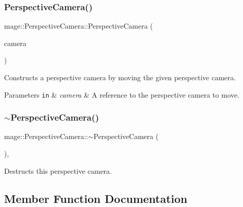 \subsubsection{\texorpdfstring{Perspective\+Camera()}{PerspectiveCamera()}\hspace{0.1cm}{\footnotesize\ttfamily [5/5]}}
{\footnotesize\ttfamily mage\+::\+Perspective\+Camera\+::\+Perspective\+Camera (\begin{DoxyParamCaption}\item[{\hyperlink{classmage_1_1_perspective_camera}{Perspective\+Camera} \&\&}]{camera }\end{DoxyParamCaption})\hspace{0.3cm}{\ttfamily [default]}}

Constructs a perspective camera by moving the given perspective camera.


\begin{DoxyParams}[1]{Parameters}
\mbox{\tt in}  & {\em camera} & A reference to the perspective camera to move. \\
\hline
\end{DoxyParams}
\hypertarget{classmage_1_1_perspective_camera_a47ba88d7458528795dd832474cdb3eb9}{}\label{classmage_1_1_perspective_camera_a47ba88d7458528795dd832474cdb3eb9} 
\subsubsection{\texorpdfstring{$\sim$\+Perspective\+Camera()}{~PerspectiveCamera()}}
{\footnotesize\ttfamily mage\+::\+Perspective\+Camera\+::$\sim$\+Perspective\+Camera (\begin{DoxyParamCaption}{ }\end{DoxyParamCaption})\hspace{0.3cm}{\ttfamily [virtual]}, {\ttfamily [default]}}

Destructs this perspective camera. 

\subsection{Member Function Documentation}
\hypertarget{classmage_1_1_perspective_camera_a21545965da7ef1b6f99887bb6d2bb095}{}\label{classmage_1_1_perspective_camera_a21545965da7ef1b6f99887bb6d2bb095} 
